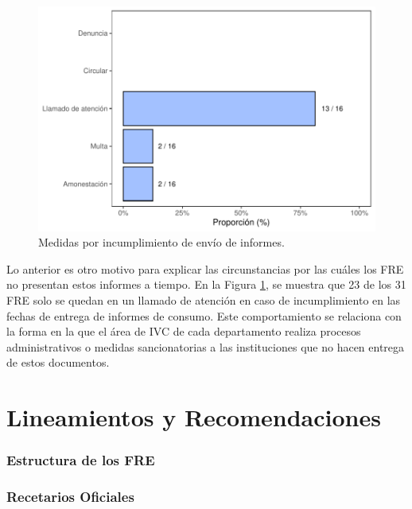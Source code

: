 \documentclass[
]{book}
\begin{document}
\begin{figure}

{\centering \includegraphics[width=0.85\linewidth]{InformeFinal_files/figure-latex/IncumplimientoEnvioInformes-1} 

}

\caption{Medidas por incumplimiento de envío de informes.}\label{fig:IncumplimientoEnvioInformes}
\end{figure}

Lo anterior es otro motivo para explicar las circunstancias por las cuáles los FRE no presentan estos informes a tiempo. En la Figura \ref{fig:IncumplimientoEnvioInformes}, se muestra que 23 de los 31 FRE solo se quedan en un llamado de atención en caso de incumplimiento en las fechas de entrega de informes de consumo. Este comportamiento se relaciona con la forma en la que el área de IVC de cada departamento realiza procesos administrativos o medidas sancionatorias a las instituciones que no hacen entrega de estos documentos.

\hypertarget{lineamientos-y-recomendaciones}{%
\chapter{Lineamientos y Recomendaciones}\label{lineamientos-y-recomendaciones}}

\hypertarget{estructura-de-los-fre}{%
\subsection{Estructura de los FRE}\label{estructura-de-los-fre}}

\hypertarget{recetarios-oficiales-1}{%
\subsection{Recetarios Oficiales}\label{recetarios-oficiales-1}}
\end{document}
